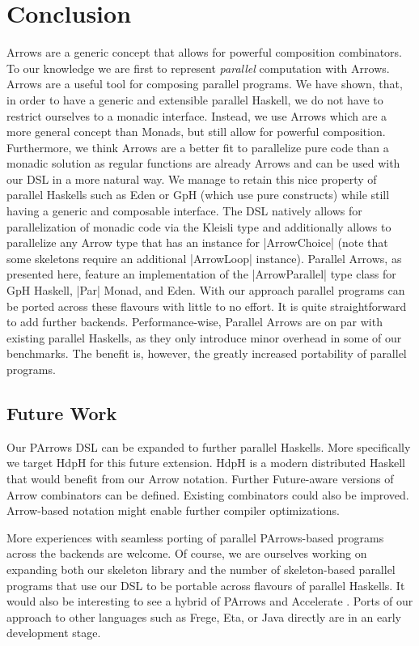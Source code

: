 
\section{Conclusion}
\label{sec:conclusion}
Arrows are a generic concept that allows for powerful composition
combinators. To our knowledge we are first to represent
\emph{parallel} computation with Arrows.
%
Arrows are a useful tool for composing parallel
programs. We have shown, that, in order to have a generic and extensible parallel Haskell, we do not have to restrict ourselves to a monadic interface. Instead, we use Arrows which are a more general concept than Monads, but still allow for powerful composition. Furthermore, we think Arrows are a better fit to parallelize pure code than a monadic solution as regular functions are already Arrows and can be used with our DSL in a more natural way. We manage to retain this nice property of parallel Haskells such as Eden or GpH (which use pure constructs) while still having a generic and composable interface.
%
The DSL natively allows for parallelization of monadic code via the Kleisli type and additionally allows to parallelize any Arrow type that has an instance for |ArrowChoice| (note that some skeletons require an additional |ArrowLoop| instance).
%
Parallel Arrows, as presented here, feature an implementation of the |ArrowParallel| type class for GpH Haskell, |Par| Monad, and Eden. With our approach parallel programs can be ported across these flavours with little to no effort. It is quite straightforward to add further backends.
%
%
Performance-wise, Parallel Arrows are on par with existing parallel Haskells, as they only introduce minor overhead in some of our benchmarks.
%
The benefit is, however, the greatly increased portability of parallel programs.



\subsection{Future Work}
\label{sec:future-work}

Our PArrows DSL can be expanded to further parallel Haskells. More specifically we target HdpH \cite{Maier:2014:HDS:2775050.2633363} for this future extension. HdpH is a modern distributed Haskell that would benefit from our Arrow notation. Further Future-aware versions of Arrow combinators can be defined. Existing combinators could also be improved.
Arrow-based notation might enable further compiler optimizations.

More experiences with seamless porting of parallel PArrows-based programs across the backends are welcome.
Of course, we are ourselves working on expanding both our skeleton library and the number of skeleton-based parallel programs that use our DSL to be portable across flavours of parallel Haskells.
It would also be interesting to see a hybrid of PArrows and Accelerate \cite{McDonell:2015:TRC:2887747.2804313}.
Ports of our approach to other languages such as Frege, Eta, or Java directly are in an early development stage.
